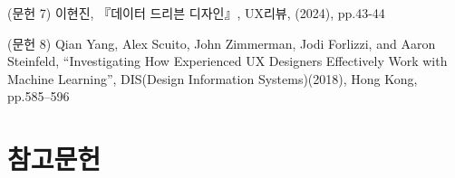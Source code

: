 \documentclass[
  letterpaper,
  DIV=11,
  numbers=noendperiod]{scrreprt}
\newlength{\cslhangindent}
\newenvironment{CSLReferences}[2] %
 {\begin{list}{}{%
  \setlength{\itemindent}{0pt}
  \setlength{\leftmargin}{0pt}
  \setlength{\parsep}{0pt}
  \ifodd #1
   \setlength{\leftmargin}{\cslhangindent}
   \setlength{\itemindent}{-1\cslhangindent}
  \fi
  \setlength{\itemsep}{#2\baselineskip}}}
 {\end{list}}
\begin{document}
(문헌 7) 이현진, 『데이터 드리븐 디자인』, UX리뷰, (2024), pp.43-44

(문헌 8) Qian Yang, Alex Scuito, John Zimmerman, Jodi Forlizzi, and
Aaron Steinfeld, ``Investigating How Experienced UX Designers
Effectively Work with Machine Learning'', DIS(Design Information
Systems)(2018), Hong Kong, pp.585--596


\chapter*{참고문헌}\label{uxcc38uxace0uxbb38uxd5cc}


\label{refs}
\begin{CSLReferences}{0}{1}
\end{CSLReferences}
\end{document}
